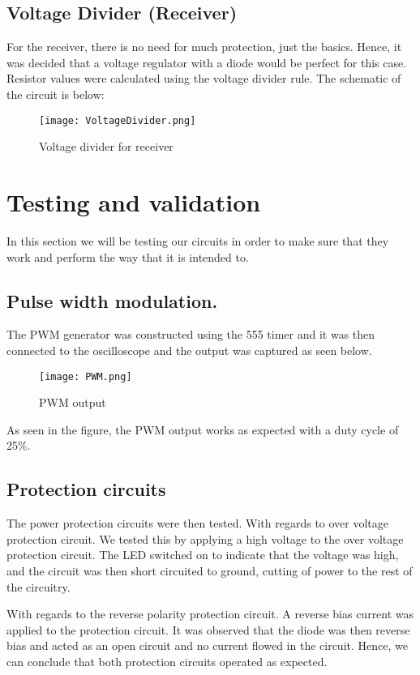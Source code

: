 \documentclass[class=report,11pt,crop=false]{standalone}
\begin{document}
\subsection{Voltage Divider (Receiver)}

For the receiver, there is no need for much protection, just the basics. Hence, it was decided that a voltage regulator with a diode would be perfect for this case. Resistor values were calculated using the voltage divider rule. The schematic of the circuit is below:
\begin{figure}
    \centering
    \texttt{[image: VoltageDivider.png]}
    \caption{Voltage divider for receiver}
    \label{fig:enter-label}
\end{figure}

\section{Testing and validation}

In this section we will be testing our circuits in order to make sure that they work and perform the way that it is intended to.

\subsection{Pulse width modulation.}

The PWM generator was constructed using the 555 timer and it was then connected to the oscilloscope and the output was captured as seen below.
\begin{figure}
    \centering
    \texttt{[image: PWM.png]}
    \caption{PWM output}
    \label{fig:enter-label}
\end{figure}

As seen in the figure, the PWM output works as expected with a duty cycle of 25\%.

\subsection{Protection circuits}

The power protection circuits were then tested. With regards to over voltage protection circuit. We tested this by applying a high voltage to the over voltage protection circuit. The LED switched on to indicate that the voltage was high, and the circuit was then short circuited to ground, cutting of power to the rest of the circuitry.

With regards to the reverse polarity protection circuit. A reverse bias current was applied to the protection circuit. It was observed that the diode was then reverse bias and acted as an open circuit and no current flowed in the circuit. Hence, we can conclude that both protection circuits operated as expected.
\end{document}
